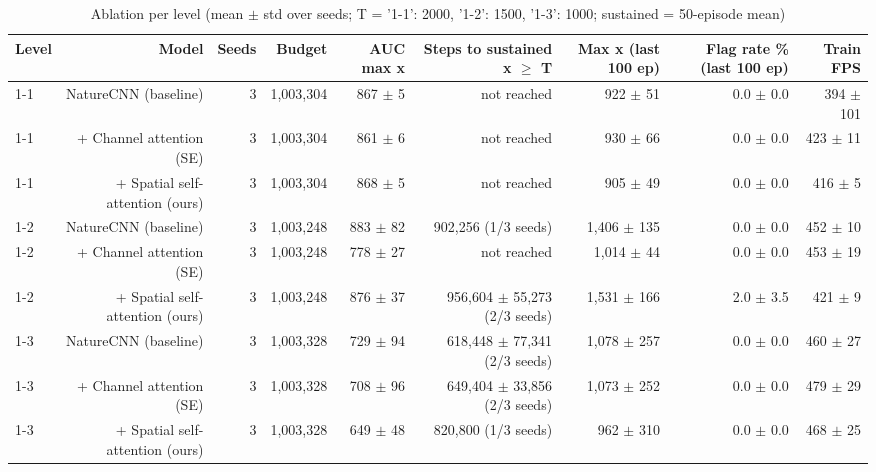 \begin{table}[t]
\centering
\caption{Ablation per level (mean $\pm$ std over seeds; T = {'1-1': 2000, '1-2': 1500, '1-3': 1000}; sustained = 50-episode mean)}
\label{tab:ablation_summary}
\begin{tabular}{lrrrrrrrr}
\toprule
Level & Model & Seeds & Budget & AUC max x & Steps to sustained x $\geq$ T & Max x (last 100 ep) & Flag rate \% (last 100 ep) & Train FPS \\
\midrule
1-1 & NatureCNN (baseline) & 3 & 1,003,304 & 867 $\pm$ 5 & not reached & 922 $\pm$ 51 & 0.0 $\pm$ 0.0 & 394 $\pm$ 101 \\
1-1 & + Channel attention (SE) & 3 & 1,003,304 & 861 $\pm$ 6 & not reached & 930 $\pm$ 66 & 0.0 $\pm$ 0.0 & 423 $\pm$ 11 \\
1-1 & + Spatial self-attention (ours) & 3 & 1,003,304 & 868 $\pm$ 5 & not reached & 905 $\pm$ 49 & 0.0 $\pm$ 0.0 & 416 $\pm$ 5 \\
1-2 & NatureCNN (baseline) & 3 & 1,003,248 & 883 $\pm$ 82 & 902,256 (1/3 seeds) & 1,406 $\pm$ 135 & 0.0 $\pm$ 0.0 & 452 $\pm$ 10 \\
1-2 & + Channel attention (SE) & 3 & 1,003,248 & 778 $\pm$ 27 & not reached & 1,014 $\pm$ 44 & 0.0 $\pm$ 0.0 & 453 $\pm$ 19 \\
1-2 & + Spatial self-attention (ours) & 3 & 1,003,248 & 876 $\pm$ 37 & 956,604 $\pm$ 55,273 (2/3 seeds) & 1,531 $\pm$ 166 & 2.0 $\pm$ 3.5 & 421 $\pm$ 9 \\
1-3 & NatureCNN (baseline) & 3 & 1,003,328 & 729 $\pm$ 94 & 618,448 $\pm$ 77,341 (2/3 seeds) & 1,078 $\pm$ 257 & 0.0 $\pm$ 0.0 & 460 $\pm$ 27 \\
1-3 & + Channel attention (SE) & 3 & 1,003,328 & 708 $\pm$ 96 & 649,404 $\pm$ 33,856 (2/3 seeds) & 1,073 $\pm$ 252 & 0.0 $\pm$ 0.0 & 479 $\pm$ 29 \\
1-3 & + Spatial self-attention (ours) & 3 & 1,003,328 & 649 $\pm$ 48 & 820,800 (1/3 seeds) & 962 $\pm$ 310 & 0.0 $\pm$ 0.0 & 468 $\pm$ 25 \\
\bottomrule
\end{tabular}
\end{table}
